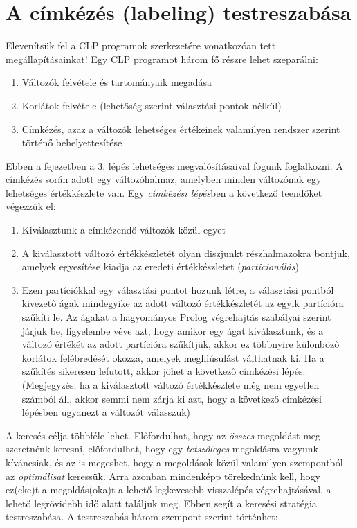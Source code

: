 \section{A címkézés (labeling) testreszabása}

Elevenítsük fel a CLP programok szerkezetére vonatkozóan tett megállapításainkat!
Egy CLP programot három fő részre lehet szeparálni:

\begin{enumerate}
\item Változók felvétele és tartományaik megadása
\item Korlátok felvétele (lehetőség szerint választási pontok nélkül)
\item Címkézés, azaz a változók lehetséges értékeinek valamilyen rendszer szerint
történő behelyettesítése
\end{enumerate}

Ebben a fejezetben a 3. lépés lehetséges megvalósításaival fogunk foglalkozni.
A címkézés során adott egy változóhalmaz, amelyben minden változónak egy lehetséges
értékkészlete van. Egy \emph{címkézési lépés}ben a következő teendőket végezzük el:

\begin{enumerate}
\item Kiválasztunk a címkézendő változók közül egyet
\item A kiválasztott változó értékkészletét olyan diszjunkt részhalmazokra bontjuk,
amelyek egyesítése kiadja az eredeti értékkészletet (\emph{particionálás})
\item Ezen partíciókkal egy választási pontot hozunk létre, a választási pontból
kivezető ágak mindegyike az adott változó értékkészletét az egyik partícióra
szűkíti le. Az ágakat a hagyományos Prolog végrehajtás szabályai szerint járjuk
be, figyelembe véve azt, hogy amikor egy ágat kiválasztunk, és a változó értékét
az adott partícióra szűkítjük, akkor ez többnyire különböző korlátok felébredését
okozza, amelyek meghiúsulást válthatnak ki. Ha a szűkítés sikeresen lefutott, akkor
jöhet a következő címkézési lépés. (Megjegyzés: ha a kiválasztott változó
értékkészlete még nem egyetlen számból áll, akkor semmi nem zárja ki azt, hogy a
következő címkézési lépésben ugyanezt a változót válasszuk)
\end{enumerate}

A keresés célja többféle lehet. Előfordulhat, hogy az \emph{összes} megoldást meg
szeretnénk keresni, előfordulhat, hogy egy \emph{tetszőleges} megoldásra vagyunk kíváncsiak,
és az is megeshet, hogy a megoldások közül valamilyen szempontból az \emph{optimálisat}
keressük. Arra azonban mindenképp törekednünk kell, hogy ez(eke)t a megoldás(oka)t a lehető
legkevesebb visszalépés végrehajtásával, a lehető legrövidebb idő alatt találjuk meg.
Ebben segít a keresési stratégia testreszabása. A testreszabás három szempont szerint
történhet:

